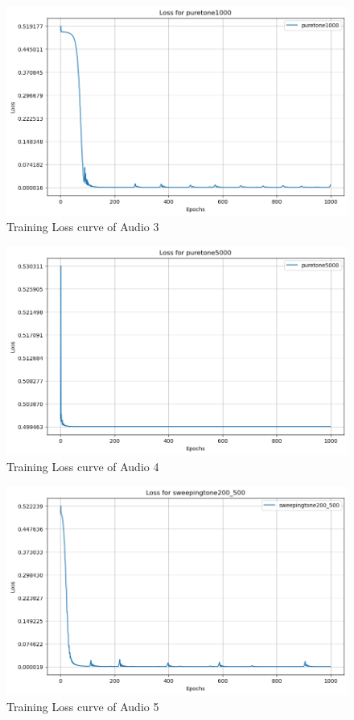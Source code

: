 \documentclass{ioereport}
\begin{document}
    \begin{figure}[H]
        \centering
        \includegraphics[width=\linewidth]{assets/audio_loss_curves/puretone1000.png}
        \caption{Training Loss curve of Audio 3}
        \label{fig:loss-curve-3}
    \end{figure}
    \begin{figure}[H]
        \centering
        \includegraphics[width=\linewidth]{assets/audio_loss_curves/puretone5000.png}
        \caption{Training Loss curve of Audio 4}
        \label{fig:loss-curve-4}
    \end{figure}
    \begin{figure}[H]
        \centering
        \includegraphics[width=\linewidth]{assets/audio_loss_curves/sweepingtone200_500.png}
        \caption{Training Loss curve of Audio 5}
        \label{fig:loss-curve-5}
    \end{figure}
\end{document}
